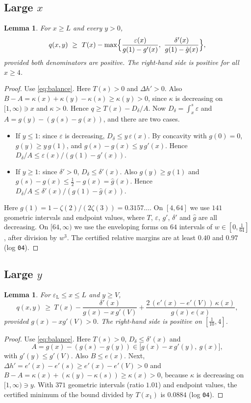 \documentclass[11pt,a4paper]{article}
\newtheorem{lemma}[theorem]{Lemma}
\theoremstyle{definition}
\theoremstyle{remark}
\newcommand{\eps}{\varepsilon}
\newcommand{\Dd}{D_\delta}
\newcommand{\eL}{\varepsilon_{\mathrm L}}
\newcommand{\Lx}{L}
\newcommand{\Vy}{V}
\begin{document}
\subsection{Large \texorpdfstring{$x$}{x}}
\begin{lemma}\label{lem:I}
For $x\ge\Lx$ and every $y>0$,
\[
q(x,y)\ \ge\ T(x)-\max\Bigl\{\frac{\eps(x)}{g(1)-g'(x)},\ \frac{\delta'(x)}{g(1)-\hat g(x)}\Bigr\},
\]
provided both denominators are positive. The right-hand side is positive for all $x\ge4$.
\end{lemma}
\begin{proof}
Use \eqref{eq:balance}. Here $T(s)>0$ and $\Delta h'>0$. Also $B-A=\kappa(x)+\kappa(y)-\kappa(s)\ge\kappa(y)>0$, since $\kappa$ is decreasing on $[1,\infty)\ni x$ and $\kappa>0$. Hence $q\ge T(x)-\Dd/A$. Now $\Dd=\int_x^{s}\eps$ and $A=g(y)-(g(s)-g(x))$, and there are two cases.
\begin{itemize}
\item If $y\le1$: since $\eps$ is decreasing, $\Dd\le y\,\eps(x)$. By concavity with $g(0)=0$, $g(y)\ge y\,g(1)$, and $g(s)-g(x)\le y\,g'(x)$. Hence $\Dd/A\le\eps(x)/(g(1)-g'(x))$.
\item If $y\ge1$: since $\delta'>0$, $\Dd\le\delta'(x)$. Also $g(y)\ge g(1)$ and $g(s)-g(x)\le\frac12-g(x)=\hat g(x)$. Hence $\Dd/A\le\delta'(x)/(g(1)-\hat g(x))$.
\end{itemize}
Here $g(1)=1-\zeta(2)/(2\zeta(3))=0.3157\ldots$. On $[4,64]$ we use $141$ geometric intervals and endpoint values, where $T$, $\eps$, $g'$, $\delta'$ and $\hat g$ are all decreasing. On $[64,\infty)$ we use the enveloping forms on $64$ intervals of $w\in[0,\frac1{64}]$, after division by $w^3$. The certified relative margins are at least $0.40$ and $0.97$ (log \texttt{04}).
\end{proof}

\subsection{Large \texorpdfstring{$y$}{y}}
\begin{lemma}\label{lem:II}
For $\eL\le x\le\Lx$ and $y\ge\Vy$,
\[
q(x,y)\ \ge\ T(x)-\frac{\delta'(x)}{g(x)-x\,g'(\Vy)}+\frac{2\,(e'(x)-e'(\Vy))\,\kappa(x)}{g(x)\,e(x)},
\]
provided $g(x)-xg'(\Vy)>0$. The right-hand side is positive on $[\frac1{10},4]$.
\end{lemma}
\begin{proof}
Use \eqref{eq:balance}. Here $T(s)>0$, $\Dd\le\delta'(x)$ and
\[
A=g(x)-(g(s)-g(y))\in\bigl[g(x)-x\,g'(y),\ g(x)\bigr],
\]
with $g'(y)\le g'(\Vy)$. Also $B\le e(x)$. Next, $\Delta h'=e'(x)-e'(s)\ge e'(x)-e'(\Vy)>0$ and $B-A=\kappa(x)+(\kappa(y)-\kappa(s))\ge\kappa(x)>0$, because $\kappa$ is decreasing on $[1,\infty)\ni y$. With $371$ geometric intervals (ratio $1.01$) and endpoint values, the certified minimum of the bound divided by $T(x_1)$ is $0.0884$ (log \texttt{04}).
\end{proof}
\end{document}
